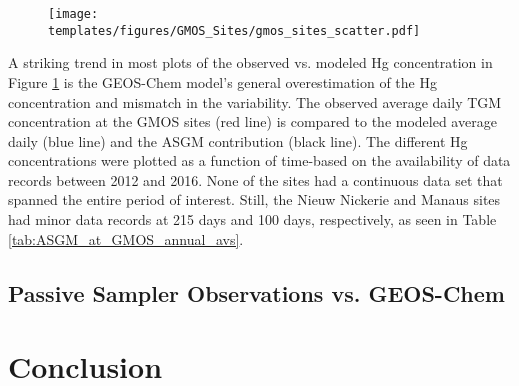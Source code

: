 \begin{flushleft}
  \begin{figure}[H]
\texttt{[image: templates/figures/GMOS\_Sites/gmos\_sites\_scatter.pdf]}
\centering
{}
\label{fig:gmos_sites_scatter}
\end{figure}
\FloatBarrier
\end{flushleft}

\begin{flushleft}
A striking trend in most plots of the observed vs. modeled Hg concentration in Figure \ref{fig:gmos_sites_scatter} is the GEOS-Chem model's general overestimation of the Hg concentration and mismatch in the variability. The observed average daily TGM concentration at the GMOS sites (red line) is compared to the modeled \on average daily \hg (blue line) and the ASGM contribution (black line). The different Hg concentrations were plotted as a function of time-based on the availability of data records between 2012 and 2016. None of the sites had a continuous data set that spanned the entire period of interest. Still, the Nieuw Nickerie and Manaus sites had minor data records at 215 days and 100 days, respectively, as seen in Table \ref{tab:ASGM_at_GMOS_annual_avs}.   
\end{flushleft}

\begin{flushleft}
 
\end{flushleft}


\subsection{Passive Sampler Observations vs. GEOS-Chem}


\begin{flushleft}


\end{flushleft}











\section{Conclusion}


